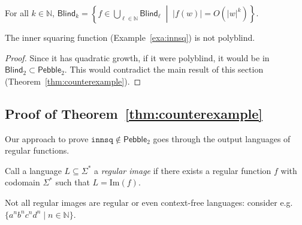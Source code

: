 \documentclass{fundam}
\newcommand{\bbN}{\mathbb{N}}
\newcommand{\Image}{\mathrm{Im}}
\newcommand{\Pebble}{\mathsf{Pebble}}
\newcommand{\Blind}{\mathsf{Blind}}
\theoremstyle{claimstyle}
\newcommand\innsq{\mathtt{innsq}}
\begin{document}
\begin{theorem}%
  \label{thm:blind-min}
  For all $k\in\bbN$, $\Blind_k = \left\{f \in \displaystyle\bigcup_{\ell\in\bbN} \Blind_\ell \;\middle|\; |f(w)| = O(|w|^k)\right\}$.
\end{theorem}

\begin{corollary}
  \label{cor:innsq-not-polyblind}
  The inner squaring function (Example~\ref{exa:innsq}) is not polyblind.
  \end{corollary}
  \begin{proof}
    Since it has quadratic growth, if it were polyblind, it would be in $\Blind_2\subset\Pebble_2$. This would contradict the main result of this section (Theorem~\ref{thm:counterexample}).
\end{proof}


\subsection{Proof of Theorem~\ref{thm:counterexample}}
\label{sec:innsq-proof}

Our approach to prove $\innsq\notin\Pebble_2$ goes through the output languages of regular functions.
\begin{definition}
Call a language $L \subseteq \Sigma^*$ a \emph{regular image} if there exists a regular function $f$ with codomain $\Sigma^*$ such that $L = \Image(f)$.
\end{definition}
Not all regular images are regular or even context-free languages: consider e.g.\ $\{ a^n b^n c^n d^n \mid n \in \mathbb{N}\}$.
\end{document}
